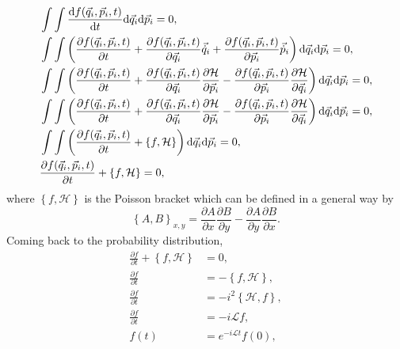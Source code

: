 \documentclass[a4paper]{article}
\begin{document}
\begin{equation}
\begin{split}
&\int\int \frac{{\rm d}f(\vec{q}_{i},\vec{p}_{i},t) }{{\rm d}t}{\rm d}\vec{q}_{i} {\rm d}\vec{p}_{i}=0,\\
&\int\int \left(\frac{\partial f(\vec{q}_{i},\vec{p}_{i},t) }{\partial t} + \frac{\partial f(\vec{q}_{i},\vec{p}_{i},t) }{\partial \vec{q}_{i}}\vec{\dot{q}}_{i} +\frac{\partial f(\vec{q}_{i},\vec{p}_{i},t) }{\partial \vec{p}_{i}}\vec{\dot{p}}_{i}  \right){\rm d}\vec{q}_{i} {\rm d}\vec{p}_{i}=0,\\
&\int\int \left(\frac{\partial f(\vec{q}_{i},\vec{p}_{i},t) }{\partial t} + \frac{\partial f(\vec{q}_{i},\vec{p}_{i},t) }{\partial \vec{q}_{i}} \frac{\partial \mathcal{H} }{\partial \vec{p}_{i}} -\frac{\partial f(\vec{q}_{i},\vec{p}_{i},t) }{\partial \vec{p}_{i}}\frac{\partial \mathcal{H} }{\partial \vec{q}_{i}}  \right){\rm d}\vec{q}_{i} {\rm d}\vec{p}_{i}=0,\\
&\int\int \left(\frac{\partial f(\vec{q}_{i},\vec{p}_{i},t) }{\partial t} + \frac{\partial f(\vec{q}_{i},\vec{p}_{i},t) }{\partial \vec{q}_{i}} \frac{\partial \mathcal{H} }{\partial \vec{p}_{i}} -\frac{\partial f(\vec{q}_{i},\vec{p}_{i},t) }{\partial \vec{p}_{i}}\frac{\partial \mathcal{H} }{\partial \vec{q}_{i}}  \right){\rm d}\vec{q}_{i} {\rm d}\vec{p}_{i}=0,\\
&\int\int \left(\frac{\partial f(\vec{q}_{i},\vec{p}_{i},t) }{\partial t} + \left\{ f,\mathcal{H}\right\} \right){\rm d}\vec{q}_{i} {\rm d}\vec{p}_{i}=0,\\
&\frac{\partial f(\vec{q}_{i},\vec{p}_{i},t) }{\partial t} + \left\{ f,\mathcal{H}\right\}=0, 
\end{split}
\end{equation}
where $\left\{ f,\mathcal{H}\right\}$ is the Poisson bracket which can be defined in a general way by
\begin{equation}
\left\{ A,B\right\}_{x,y}=\frac{\partial A}{\partial x}\frac{\partial B}{\partial y}-\frac{\partial A}{\partial y}\frac{\partial B}{\partial x}.
\end{equation}
Coming back to the probability distribution,
\begin{equation}
\begin{split}
\frac{\partial f}{\partial t} + \left\{ f,\mathcal{H}\right\}&=0,\\
\frac{\partial f}{\partial t} &= -\left\{ f,\mathcal{H}\right\},\\
\frac{\partial f}{\partial t} &=-i^{2}\left\{ \mathcal{H},f\right\},\\
\frac{\partial f}{\partial t} &=-i\mathscr{L}f,\\
f(t)&=e^{-i\mathscr{L}t}f(0),
\end{split}
\end{equation}
\end{document}
